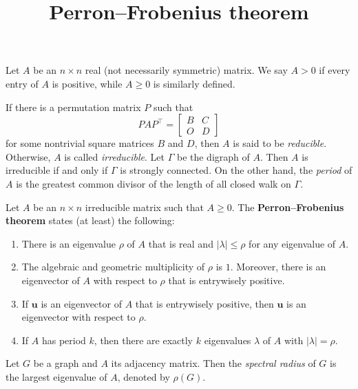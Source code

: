 \documentclass{article}
\title{Perron--Frobenius theorem}
\date{\vspace{-1cm}}
\newcommand{\trans}{^\top}
\newcommand{\bu}{\mathbf{u}}
\theoremstyle{definition}
\begin{document}
\maketitle
\large

Let $A$ be an $n\times n$ real (not necessarily symmetric) matrix.  We say $A > 0$ if every entry of $A$ is positive, while $A\geq 0$ is similarly defined.  

If there is a permutation matrix $P$ such that 
\[PAP\trans = \begin{bmatrix}
 B & C \\
 O & D
\end{bmatrix}\]
for some nontrivial square matrices $B$ and $D$, then $A$ is said to be \emph{reducible}.  Otherwise, $A$ is called \emph{irreducible}.  Let $\Gamma$ be the digraph of $A$.  Then $A$ is irreducible if and only if $\Gamma$ is strongly connected.  On the other hand, the \emph{period} of $A$ is the greatest common divisor of the length of all closed walk on $\Gamma$.  

Let $A$ be an $n\times n$ irreducible matrix such that $A\geq 0$.  
The \textbf{Perron--Frobenius theorem} states (at least) the following:
\begin{enumerate}
\item There is an eigenvalue $\rho$ of $A$ that is real and $|\lambda|\leq\rho$ for any eigenvalue of $A$.
\item The algebraic and geometric multiplicity of $\rho$ is $1$.  Moreover, there is an eigenvector of $A$ with respect to $\rho$ that is entrywisely positive.
\item If $\bu$ is an eigenvector of $A$ that is 
entrywisely positive, then $\bu$ is an eigenvector with respect to $\rho$.
\item If $A$ has period $k$, then there are exactly $k$ eigenvalues $\lambda$ of $A$ with $|\lambda| = \rho$.  
\end{enumerate}

Let $G$ be a graph and $A$ its adjacency matrix.  Then the \emph{spectral radius} of $G$ is the largest eigenvalue of $A$, denoted by $\rho(G)$.
\end{document}
